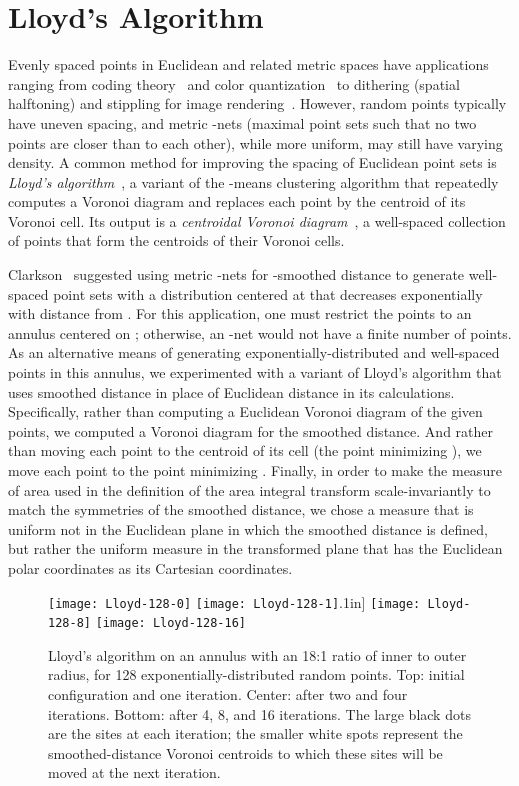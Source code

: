 \documentclass[10pt, conference, compsocconf]{IEEEtran}
\begin{document}
\section{Lloyd's Algorithm}
\label{sec:lloyd}

Evenly spaced points in Euclidean and related metric spaces have applications ranging from coding theory~\cite{Llo-ITIT-82} and color quantization~\cite{Hec-SIGGRAPH-82} to dithering (spatial halftoning) and stippling for image rendering~\cite{MacIseAnd-CG-08,Uli-87}. However, random points  typically have uneven spacing, and metric -nets (maximal point sets such that no two points are closer than  to each other), while more uniform, may still have varying density. A common method for improving the spacing of Euclidean point sets is \emph{Lloyd's algorithm}~\cite{Llo-ITIT-82}, a variant of the -means clustering algorithm that repeatedly computes a Voronoi diagram and replaces each point by the centroid of its Voronoi cell. Its output is a \emph{centroidal Voronoi diagram}~\cite{DuFabGun-SR-99}, a well-spaced collection of points that form the centroids of their Voronoi cells.

Clarkson~\cite{Cla-UCI-08} suggested using metric -nets for -smoothed distance to generate well-spaced point sets with a distribution centered at  that decreases exponentially with distance from . For this application, one must restrict the points to an annulus centered on ; otherwise, an -net would not have a finite number of points. As an alternative means of generating exponentially-distributed and well-spaced points in this annulus, we experimented with a variant of Lloyd's algorithm that uses smoothed distance in place of Euclidean distance in its calculations.
Specifically, rather than computing a Euclidean Voronoi diagram of the given points, we computed a Voronoi diagram for the smoothed distance. And rather than moving each point to the centroid of its cell  (the point  minimizing ), we move each point to the point minimizing . Finally, in order to make the measure  of area used in the definition of the area integral transform scale-invariantly to match the symmetries of the smoothed distance, we chose a measure that is uniform not in the Euclidean plane in which the smoothed distance is defined, but rather the uniform measure in the transformed plane that has the Euclidean polar coordinates  as its Cartesian coordinates.

\begin{figure}[t]
\centering
\texttt{[image: Lloyd-128-0]}\qquad
\texttt{[image: Lloyd-128-1]}\0.1in]
\texttt{[image: Lloyd-128-8]}\qquad
\texttt{[image: Lloyd-128-16]}
\caption{Lloyd's algorithm on an annulus with an 18:1 ratio of inner to outer radius, for 128 exponentially-distributed random points. Top: initial configuration and one iteration. Center: after two and four iterations. Bottom: after 4, 8, and 16 iterations. The large black dots are the sites at each iteration; the smaller white spots represent the smoothed-distance Voronoi centroids to which these sites will be moved at the next iteration.}
\label{fig:lloyd}
\end{figure}
\end{document}
